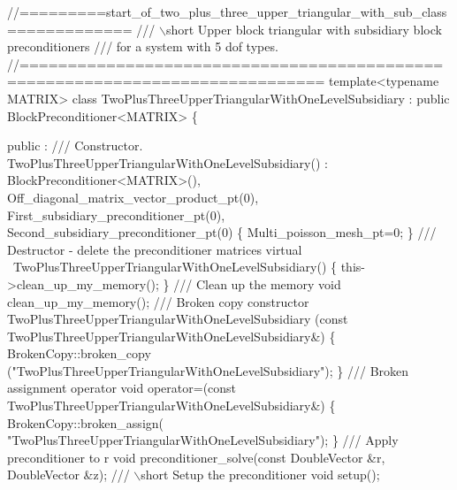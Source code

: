 \begin{DoxyCodeInclude}
\textcolor{comment}{//=========start\_of\_two\_plus\_three\_upper\_triangular\_with\_sub\_class=============}\textcolor{comment}{}
\textcolor{comment}{/// \(\backslash\)short Upper block triangular with subsidiary block preconditioners }
\textcolor{comment}{/// for a system with 5 dof types.}
\textcolor{comment}{}\textcolor{comment}{//=============================================================================}
 \textcolor{keyword}{template}<\textcolor{keyword}{typename} MATRIX> 
 \textcolor{keyword}{class }TwoPlusThreeUpperTriangularWithOneLevelSubsidiary 
  : \textcolor{keyword}{public} BlockPreconditioner<MATRIX>
 \{
 
 public :
 \textcolor{comment}{}
\textcolor{comment}{  /// Constructor.}
\textcolor{comment}{}  TwoPlusThreeUpperTriangularWithOneLevelSubsidiary() :
   BlockPreconditioner<MATRIX>(),
    Off\_diagonal\_matrix\_vector\_product\_pt(0),
    First\_subsidiary\_preconditioner\_pt(0),
    Second\_subsidiary\_preconditioner\_pt(0)
   \{
    Multi\_poisson\_mesh\_pt=0;
   \}
 \textcolor{comment}{}
\textcolor{comment}{  /// Destructor - delete the preconditioner matrices}
\textcolor{comment}{}  \textcolor{keyword}{virtual} ~TwoPlusThreeUpperTriangularWithOneLevelSubsidiary()
   \{
    this->clean\_up\_my\_memory();
   \}
\textcolor{comment}{}
\textcolor{comment}{  /// Clean up the memory}
\textcolor{comment}{}  \textcolor{keywordtype}{void} clean\_up\_my\_memory();
 \textcolor{comment}{}
\textcolor{comment}{  /// Broken copy constructor}
\textcolor{comment}{}  TwoPlusThreeUpperTriangularWithOneLevelSubsidiary
  (\textcolor{keyword}{const} TwoPlusThreeUpperTriangularWithOneLevelSubsidiary&) 
   \{ 
    BrokenCopy::broken\_copy
     (\textcolor{stringliteral}{"TwoPlusThreeUpperTriangularWithOneLevelSubsidiary"});
   \} 
 \textcolor{comment}{}
\textcolor{comment}{  /// Broken assignment operator}
\textcolor{comment}{}  \textcolor{keywordtype}{void} operator=(\textcolor{keyword}{const} 
                 TwoPlusThreeUpperTriangularWithOneLevelSubsidiary&) 
   \{
    BrokenCopy::broken\_assign(
     \textcolor{stringliteral}{"TwoPlusThreeUpperTriangularWithOneLevelSubsidiary"});
   \}
 \textcolor{comment}{}
\textcolor{comment}{  /// Apply preconditioner to r}
\textcolor{comment}{}  \textcolor{keywordtype}{void} preconditioner\_solve(\textcolor{keyword}{const} DoubleVector &r, DoubleVector &z);
 \textcolor{comment}{}
\textcolor{comment}{  /// \(\backslash\)short Setup the preconditioner }
\textcolor{comment}{}  \textcolor{keywordtype}{void} setup();


\end{DoxyCodeInclude}
